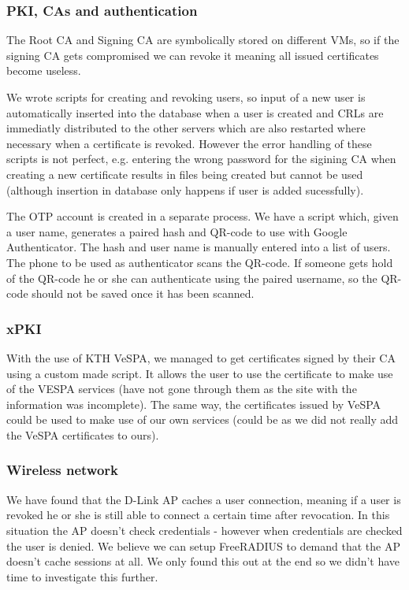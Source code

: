 \subsubsection*{PKI, CAs and authentication}

The Root CA and Signing CA are symbolically stored on different VMs, so if the signing CA gets compromised we can revoke it meaning all issued certificates become useless. 

We wrote scripts for creating and revoking users, so input of a new user is automatically inserted into the database when a user is created and CRLs are immediatly distributed to the other servers which are also restarted where necessary when a certificate is revoked. However the error handling of these scripts is not perfect, e.g. entering the wrong password for the sigining CA when creating a new certificate results in files being created but cannot be used (although insertion in database only happens if user is added sucessfully).

The OTP account is created in a separate process. We have a script which, given a user name, generates a paired hash and QR-code to use with Google Authenticator. The hash and user name is manually entered into a list of users. The phone to be used as authenticator scans the QR-code. If someone gets hold of the QR-code he or she can authenticate using the paired username, so the QR-code should not be saved once it has been scanned.

\subsubsection*{xPKI}

With the use of KTH VeSPA, we managed to get certificates signed by their CA using a custom made script. It allows the user to use the certificate to make use of the VESPA services (have not gone through them as the site with the information was incomplete). The same way, the certificates issued by VeSPA could be used to make use of our own services (could be as we did not really add the VeSPA certificates to ours).

\subsubsection*{Wireless network}

We have found that the D-Link AP caches a user connection, meaning if a user is revoked he or she is still able to connect a certain time after revocation. In this situation the AP doesn't check credentials - however when credentials are checked the user is denied. We believe we can setup FreeRADIUS to demand that the AP doesn't cache sessions at all. We only found this out at the end so we didn't have time to investigate this further.

